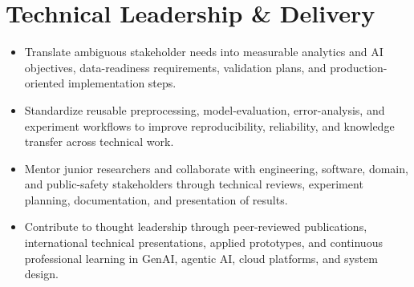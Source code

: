 \documentclass[9pt,letterpaper]{extarticle}
\begin{document}
\section{Technical Leadership \& Delivery}
\begin{itemize}
\item Translate ambiguous stakeholder needs into measurable analytics and AI objectives, data-readiness requirements, validation plans, and production-oriented implementation steps.
\item Standardize reusable preprocessing, model-evaluation, error-analysis, and experiment workflows to improve reproducibility, reliability, and knowledge transfer across technical work.
\item Mentor junior researchers and collaborate with engineering, software, domain, and public-safety stakeholders through technical reviews, experiment planning, documentation, and presentation of results.
\item Contribute to thought leadership through peer-reviewed publications, international technical presentations, applied prototypes, and continuous professional learning in GenAI, agentic AI, cloud platforms, and system design.
\end{itemize}
\end{document}
